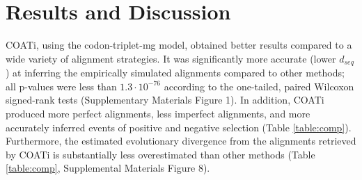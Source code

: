 \documentclass[12pt,letterpaper]{article}
\begin{document}
\section*{Results and Discussion}


COATi, using the codon-triplet-mg model, obtained better results compared to a wide variety of alignment strategies.
It was significantly more accurate (lower $d_{seq}$) at inferring the empirically simulated alignments compared to other methods; all p-values were less than $1.3 \cdot 10^{-76}$ according to the one-tailed, paired Wilcoxon signed-rank tests (Supplementary Materials Figure 1).
%
In addition, COATi produced more perfect alignments, less imperfect alignments, and more accurately inferred events of positive and negative selection (Table \ref{table:comp}). Furthermore, the estimated evolutionary divergence from the alignments retrieved by COATi is substantially less overestimated than other methods (Table \ref{table:comp}, Supplemental Materials Figure 8).
\end{document}
